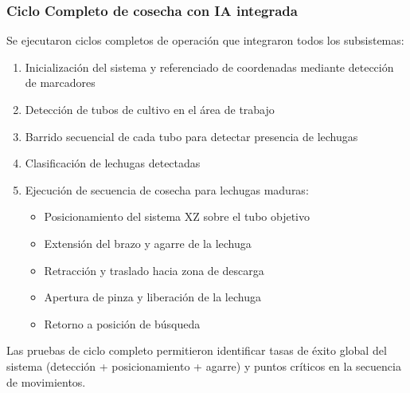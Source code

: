 \subsubsection{Ciclo Completo de cosecha con IA integrada}

Se ejecutaron ciclos completos de operación que integraron todos los subsistemas:

\begin{enumerate}
    \item Inicialización del sistema y referenciado de coordenadas mediante detección de marcadores
    \item Detección de tubos de cultivo en el área de trabajo
    \item Barrido secuencial de cada tubo para detectar presencia de lechugas
    \item Clasificación de lechugas detectadas
    \item Ejecución de secuencia de cosecha para lechugas maduras:
    \begin{itemize}
        \item Posicionamiento del sistema XZ sobre el tubo objetivo
        \item Extensión del brazo y agarre de la lechuga
        \item Retracción y traslado hacia zona de descarga
        \item Apertura de pinza y liberación de la lechuga
        \item Retorno a posición de búsqueda
    \end{itemize}
\end{enumerate}

Las pruebas de ciclo completo permitieron identificar tasas de éxito global del sistema (detección + posicionamiento + agarre) y puntos críticos en la secuencia de movimientos. 
